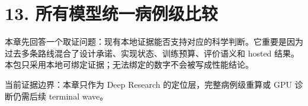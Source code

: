 \section{13. 所有模型统一病例级比较}

本章先回答一个取证问题：现有本地证据能否支持对应的科学判断。它重要是因为过去多条路线混合了设计承诺、实现状态、训练预算、评价语义和 hosted 结果。本包只采用本地可绑定证据；无法绑定的数字不会被写成性能结论。



当前证据边界：本章只作为 Deep Research 的定位层，完整病例级重算或 GPU 诊断仍需后续 terminal wave。



\clearpage